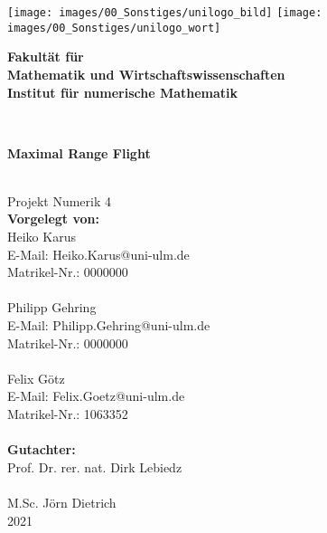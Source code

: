 \documentclass[
a4paper,
10pt, %
headsepline,           %
oneside,               %
pointlessnumbers,      %
bibtotoc,              %
]{scrbook}
\makeatletter
\newcommand{\Heiko}{Heiko Karus}
\newcommand{\Philipp}{Philipp Gehring}
\newcommand{\Felix}{Felix Götz}
\newcommand{\Hemail}{Heiko.Karus@uni-ulm.de}
\newcommand{\Pemail}{Philipp.Gehring@uni-ulm.de}
\newcommand{\Femail}{Felix.Goetz@uni-ulm.de}
\newcommand{\Hmatnr}{0000000}
\newcommand{\Pmatnr}{0000000}
\newcommand{\Fmatnr}{1063352}
\newcommand{\titel}{Maximal Range Flight}
\newcommand{\jahr}{2021}
\newcommand{\gutachterA}{Prof. Dr. rer. nat. Dirk Lebiedz}
\newcommand{\gutachterB}{M.Sc. Jörn Dietrich}
\newcommand{\fakultaet}{Mathematik und Wirtschaftswissenschaften}
\newcommand{\institut}{Institut für numerische Mathematik}
\makeatother
\begin{document}

\frontmatter

\thispagestyle{empty}
\begin{addmargin*}[4mm]{-10mm}

\texttt{[image: images/00\_Sonstiges/unilogo\_bild]}
\hfill
\texttt{[image: images/00\_Sonstiges/unilogo\_wort]}\\[2em]



{\footnotesize
\hspace*{130mm}\parbox[t]{35mm}{
\bfseries Fakultät für\\
\fakultaet\\
\mdseries \institut
}\\[2cm]

\parbox{140mm}{\bfseries \LARGE \titel}\\[2.5em]
{\footnotesize Projekt Numerik 4}\\[2em]

{\footnotesize \bfseries Vorgelegt von:}\\
{\footnotesize \Heiko \\ E-Mail: \Hemail \\ Matrikel-Nr.: \Hmatnr}\\ \\%
{\footnotesize \Philipp \\ E-Mail: \Pemail \\ Matrikel-Nr.: \Pmatnr}\\ \\%
{\footnotesize \Felix \\ E-Mail: \Femail \\ Matrikel-Nr.: \Fmatnr}\\ \\[2em]

{\footnotesize \bfseries Gutachter:}\\                     
{\footnotesize \gutachterA}\\ \\%
{\footnotesize \gutachterB}\\[2em]

{\footnotesize \jahr}
}
\end{addmargin*}
\end{document}
